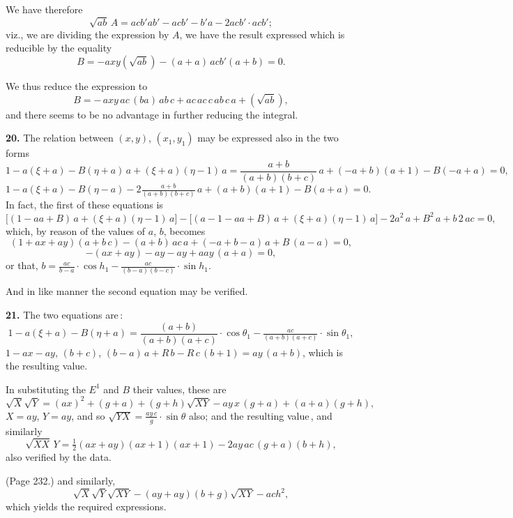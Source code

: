 \documentclass[11pt,a4paper]{article}
\theoremstyle{plain}
\theoremstyle{definition}
\begin{document}
We have therefore
\[
\sqrt{a b}\,A = a c b' a b' - a c b' - b' a - 2 a c b' \cdot a c b';
\]
viz., we are dividing the expression by $A$, we have the result expressed which is reducible by the equality
\[
B = -a x y (\sqrt{a b}) - (a + a)\,a c b' (a + b) = 0.
\]

We thus reduce the expression to
\[
B = -\,a x y\,a c\,(b a)\,a b\,c + a c\,a c\,c\,a b\,c\,a + (\sqrt{a b}),
\]
and there seems to be no advantage in further reducing the integral.

\medskip

\noindent\textbf{20.} The relation between $(x, y)$, $(x_1, y_1)$ may be expressed also in the two forms
\[
1 - a (\xi + a) - B (\eta + a)\,a + (\xi + a)(\eta - 1)\,a = \frac{a + b}{(a + b)(b + c)}\,a + (- a + b)(a + 1) - B (- a + a) = 0,
\]
\[
1 - a(\xi + a) - B (\eta - a) - 2 \tfrac{a + b}{(a + b)(b + c)}\,a + (a + b)(a + 1) - B (a + a) = 0.
\]
In fact, the first of these equations is
\[
\Big[(1 - aa + B)\,a + (\xi + a)(\eta - 1)\,a\Big] - \Big[(a - 1 - a a + B)\,a + (\xi + a)(\eta - 1)\,a\Big] - 2 a^2\,a + B^2\,a + b\,2\,a c = 0,
\]
which, by reason of the values of $a$, $b$, becomes
\[
(1 + a x + a y)(a + b\,c) - (a + b)\,a c\,a + (- a + b - a)\,a + B\,(a - a) = 0,
\]
\[
- (a x + a y) - a y - a y + a a y\,(a + a) = 0,
\]
or that, $b = \frac{a c}{ b - a}\cdot \cos h_1 - \tfrac{a c}{(b - a)(b - c)}\cdot \sin h_1$.

And in like manner the second equation may be verified.

\medskip

\noindent\textbf{21.} The two equations are\,:
\[
1 - a (\xi + a) - B (\eta + a) = \frac{(a + b)}{(a + b)(a + c)}\cdot \cos \theta_1 - \tfrac{a c}{(a + b)(a + c)}\cdot \sin\theta_1,
\]
$1 - a x - a y$, $(b + c)$, $(b - a)\,a + R\,b - R\,c\,(b + 1) = a y\,(a + b)$,
which is the resulting value.

In substituting the $E^1$ and $B$ their values, these are
\[
\sqrt{X}\sqrt{Y} = (a x)^2 + (g + a) + (g + h)\sqrt{X Y} - a y\,x\,(g + a) + (a + a)(g + h),
\]
$X = a y$, $Y = a y$, and so $\sqrt{Y X} = \tfrac{a y\,c}{ g} \cdot \sin\theta$ also; and the resulting value\,, and similarly
\[
\sqrt{X X}\,Y = \tfrac{1}{2} (a x + a y)(a x + 1)(a x + 1) - 2 a y\,a c\,(g + a)(b + h),
\]
also verified by the data.

\medskip

\noindent (Page 232.) and similarly,
\[
\sqrt{X}\sqrt{Y}\sqrt{XY} - (a y + a y)(b + g)\sqrt{XY} - a c h^2,
\]
which yields the required expressions.
\end{document}
